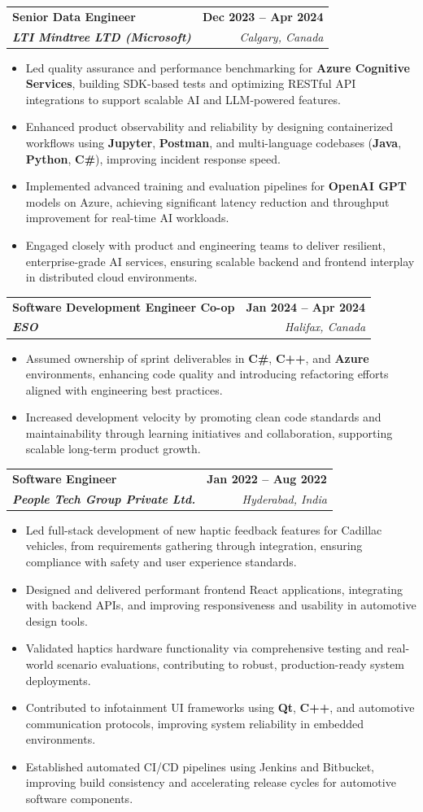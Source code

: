 \documentclass[letterpaper,11pt]{article}
\makeatletter
\newcommand{\resumeItem}[1]{
  \item\small{
    {#1 \vspace{-2pt}}
  }
}
\newcommand{\resumeSubheading}[4]{
  \vspace{-2pt}\item
    \begin{tabular*}{1.0\textwidth}[t]{l@{\extracolsep{\fill}}r}
      \textbf{#1} & \textbf{\small #2} \\
      \textit{\small#3} & \textit{\small #4} \\
    \end{tabular*}\vspace{-7pt}
}
\newcommand{\resumeItemListStart}{\begin{itemize}}
\newcommand{\resumeItemListEnd}{\end{itemize}\vspace{-5pt}}
\makeatother
\begin{document}
    \resumeSubheading
      {\textbf{Senior Data Engineer}}{\textbf{Dec 2023 -- Apr 2024}}
      {\textbf{LTI Mindtree LTD (Microsoft)}}{Calgary, Canada}
      \resumeItemListStart
        \resumeItem{Led quality assurance and performance benchmarking for \textbf{Azure Cognitive Services}, building SDK-based tests and optimizing RESTful API integrations to support scalable AI and LLM-powered features.}
        \resumeItem{Enhanced product observability and reliability by designing containerized workflows using \textbf{Jupyter}, \textbf{Postman}, and multi-language codebases (\textbf{Java}, \textbf{Python}, \textbf{C\#}), improving incident response speed.}
        \resumeItem{Implemented advanced training and evaluation pipelines for \textbf{OpenAI GPT} models on Azure, achieving significant latency reduction and throughput improvement for real-time AI workloads.}
        \resumeItem{Engaged closely with product and engineering teams to deliver resilient, enterprise-grade AI services, ensuring scalable backend and frontend interplay in distributed cloud environments.}
      \resumeItemListEnd
    
    \resumeSubheading
      {\textbf{Software Development Engineer Co-op}}{\textbf{Jan 2024 -- Apr 2024}}
      {\textbf{ESO}}{Halifax, Canada}
      \resumeItemListStart
        \resumeItem{Assumed ownership of sprint deliverables in \textbf{C\#}, \textbf{C++}, and \textbf{Azure} environments, enhancing code quality and introducing refactoring efforts aligned with engineering best practices.}
        \resumeItem{Increased development velocity by promoting clean code standards and maintainability through learning initiatives and collaboration, supporting scalable long-term product growth.}
      \resumeItemListEnd

    \resumeSubheading
      {\textbf{Software Engineer}}{\textbf{Jan 2022 -- Aug 2022}}
      {\textbf{People Tech Group Private Ltd.}}{Hyderabad, India}
      \resumeItemListStart
        \resumeItem{Led full-stack development of new haptic feedback features for Cadillac vehicles, from requirements gathering through integration, ensuring compliance with safety and user experience standards.}
        \resumeItem{Designed and delivered performant frontend React applications, integrating with backend APIs, and improving responsiveness and usability in automotive design tools.}
        \resumeItem{Validated haptics hardware functionality via comprehensive testing and real-world scenario evaluations, contributing to robust, production-ready system deployments.}
        \resumeItem{Contributed to infotainment UI frameworks using \textbf{Qt}, \textbf{C++}, and automotive communication protocols, improving system reliability in embedded environments.}
        \resumeItem{Established automated CI/CD pipelines using Jenkins and Bitbucket, improving build consistency and accelerating release cycles for automotive software components.}
      \resumeItemListEnd
\end{document}

